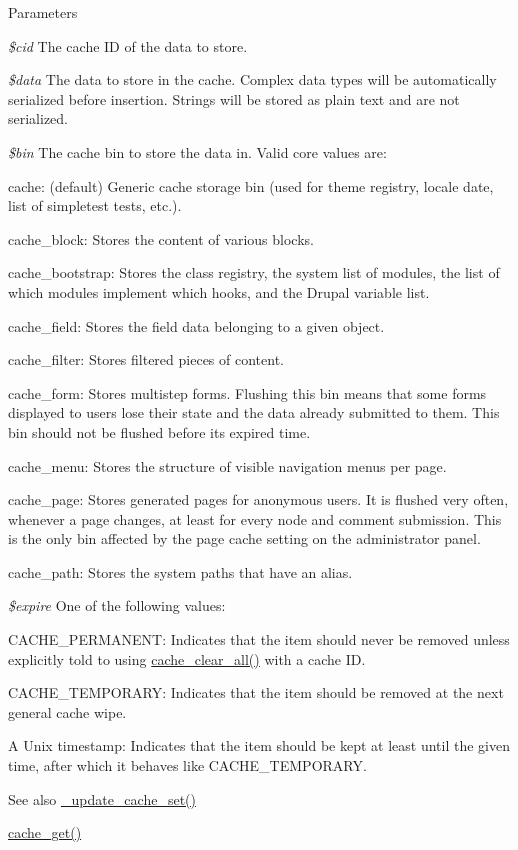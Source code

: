 \begin{DoxyParams}{Parameters}
\item[{\em \$cid}]The cache ID of the data to store. \item[{\em \$data}]The data to store in the cache. Complex data types will be automatically serialized before insertion. Strings will be stored as plain text and are not serialized. \item[{\em \$bin}]The cache bin to store the data in. Valid core values are:
\begin{DoxyItemize}
\item cache: (default) Generic cache storage bin (used for theme registry, locale date, list of simpletest tests, etc.).
\item cache\_\-block: Stores the content of various blocks.
\item cache\_\-bootstrap: Stores the class registry, the system list of modules, the list of which modules implement which hooks, and the Drupal variable list.
\item cache\_\-field: Stores the field data belonging to a given object.
\item cache\_\-filter: Stores filtered pieces of content.
\item cache\_\-form: Stores multistep forms. Flushing this bin means that some forms displayed to users lose their state and the data already submitted to them. This bin should not be flushed before its expired time.
\item cache\_\-menu: Stores the structure of visible navigation menus per page.
\item cache\_\-page: Stores generated pages for anonymous users. It is flushed very often, whenever a page changes, at least for every node and comment submission. This is the only bin affected by the page cache setting on the administrator panel.
\item cache\_\-path: Stores the system paths that have an alias. 
\end{DoxyItemize}\item[{\em \$expire}]One of the following values:
\begin{DoxyItemize}
\item CACHE\_\-PERMANENT: Indicates that the item should never be removed unless explicitly told to using \hyperlink{includes_2cache_8inc_a409b34dd629640d791a11736a9de8125}{cache\_\-clear\_\-all()} with a cache ID.
\item CACHE\_\-TEMPORARY: Indicates that the item should be removed at the next general cache wipe.
\item A Unix timestamp: Indicates that the item should be kept at least until the given time, after which it behaves like CACHE\_\-TEMPORARY.
\end{DoxyItemize}\end{DoxyParams}
\begin{DoxySeeAlso}{See also}
\hyperlink{group__update__status__cache_ga3610ff1515f81f28c69b019e5482b77b}{\_\-update\_\-cache\_\-set()} 

\hyperlink{includes_2cache_8inc_a9d873815c28909b61c3a6188b383f8a3}{cache\_\-get()} 
\end{DoxySeeAlso}
